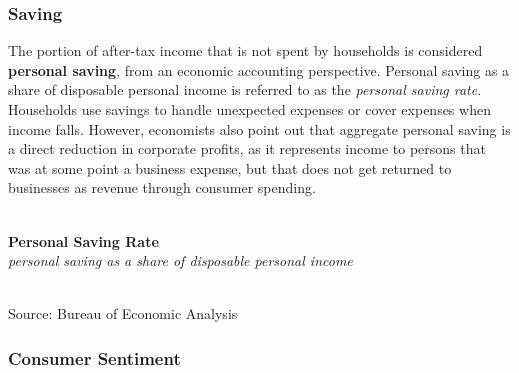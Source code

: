 \documentclass{report}
\makeatletter
\newcommand{\tbllink}[1]{\href{https://raw.githubusercontent.com/bdecon/US-chartbook/master/chartbook/data/#1}{\faTable}}
\newcommand*\short[1]{\expandafter\@gobbletwo\number\numexpr#1\relax}
\newcommand{\dateaxisticks}{
		date coordinates in=x, axis line style={draw=none},
		xmax={2020-05-10},
		max space between ticks=40,	    
		xtick={{1990-01-01}, {1992-01-01}, {1994-01-01}, 
			{1996-01-01}, {1998-01-01}, {2000-01-01}, 
			{2002-01-01}, {2004-01-01}, {2006-01-01},
			{2008-01-01}, {2010-01-01}, {2012-01-01}, {2014-01-01},
		    {2016-01-01}, {2018-01-01}, {2020-01-01}},
		minor xtick={{1989-01-01}, {1991-01-01}, {1993-01-01},
			{1995-01-01}, {1997-01-01}, {1999-01-01}, 
			{2001-01-01}, {2003-01-01}, {2005-01-01}, {2007-01-01},
		    {2009-01-01}, {2011-01-01}, {2013-01-01}, {2015-01-01},
		    {2017-01-01}, {2019-01-01}},
		enlarge y limits={0.06}, enlarge x limits={0.01},
		}
\newcommand{\bbar}[2]{extra #1 ticks = {{#2}}, extra #1 tick labels = ,
		extra #1 tick style = {grid=major, grid style={thick, black!25}},}
\newcommand{\stdline}[4]{\addplot[very thick, no markers, color=#1] 
		table [x=#2, y=#3, col sep=comma] {#4};	}
\newcommand{\rbars}{
		\fill[color=black!10] (axis cs:{1990-07-01},\pgfkeysvalueof{/pgfplots/ymin}) rectangle 
			(axis cs:{1991-03-01}, \pgfkeysvalueof{/pgfplots/ymax});
		\fill[color=black!10] (axis cs:{2007-12-01},\pgfkeysvalueof{/pgfplots/ymin}) rectangle 
			(axis cs:{2009-07-01}, \pgfkeysvalueof{/pgfplots/ymax});
		\fill[color=black!10] (axis cs:{2001-03-01},\pgfkeysvalueof{/pgfplots/ymin}) rectangle 
			(axis cs:{2001-11-01}, \pgfkeysvalueof{/pgfplots/ymax});}
\makeatother
\begin{document}
{{{{\begin{minipage}{0.76\textwidth}
\end{minipage}

\newpage


\begin{minipage}{0.76\textwidth}

\subsubsection*{\color{black!70} \seriffont Saving}

\small The portion of after-tax income that is not spent by households is considered \textbf{personal saving}, from an economic accounting perspective. Personal saving as a share of disposable personal income is referred to as the \textit{personal saving rate}. Households use savings to handle unexpected expenses or cover expenses when income falls. However, economists also point out that aggregate personal saving is a direct reduction in corporate profits, as it represents income to persons that was at some point a business expense, but that does not get returned to businesses as revenue through consumer spending. \\

\\

\vspace{2mm}

\noindent \normalsize \textbf{Personal Saving Rate}\\
\footnotesize{\textit{personal saving as a share of disposable personal income}}\\
\noindent \hspace*{-2mm} \\
\footnotesize{Source: Bureau of Economic Analysis} \hspace{66mm} \tbllink{psavert.csv}\\

\vspace{6mm}


\subsubsection*{\color{black!70} \seriffont Consumer Sentiment}



\end{minipage}}}}}
\end{document}
